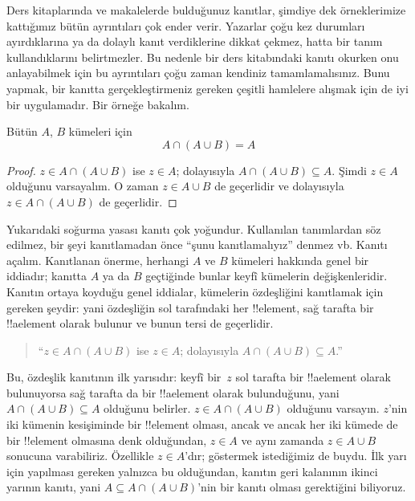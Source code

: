 \documentclass[../../../include/open-logic-section]{subfiles}
\begin{document}

Ders kitaplarında ve makalelerde bulduğunuz kanıtlar, şimdiye dek
örneklerimize kattığımız bütün ayrıntıları çok ender verir. Yazarlar
çoğu kez durumları ayırdıklarına ya da dolaylı kanıt verdiklerine dikkat
çekmez, hatta bir tanım kullandıklarını belirtmezler. Bu nedenle bir
ders kitabındaki kanıtı okurken onu anlayabilmek için bu ayrıntıları
çoğu zaman kendiniz tamamlamalısınız. Bunu yapmak, bir kanıtta
gerçekleştirmeniz gereken çeşitli hamlelere alışmak için de iyi bir
uygulamadır. Bir örneğe bakalım.

\begin{prop}[Soğurma]
Bütün $A$, $B$ kümeleri için
\[
A \cap (A \cup B) = A
\]
\end{prop}

\begin{proof}
$z \in A \cap (A \cup B)$ ise $z \in A$; dolayısıyla $A \cap (A \cup
B) \subseteq A$. Şimdi $z \in A$ olduğunu varsayalım. O zaman $z \in
A \cup B$ de geçerlidir ve dolayısıyla $z \in A \cap (A \cup B)$ de
geçerlidir.
\end{proof}

Yukarıdaki soğurma yasası kanıtı çok yoğundur. Kullanılan tanımlardan
söz edilmez, bir şeyi kanıtlamadan önce ``şunu kanıtlamalıyız'' denmez
vb. Kanıtı açalım. Kanıtlanan önerme, herhangi $A$ ve $B$ kümeleri
hakkında genel bir iddiadır; kanıtta $A$ ya da $B$ geçtiğinde bunlar
keyfî kümelerin değişkenleridir. Kanıtın ortaya koyduğu genel iddialar,
kümelerin özdeşliğini kanıtlamak için gereken şeydir: yani özdeşliğin
sol tarafındaki her !!{element}, sağ tarafta bir !!a{element} olarak bulunur ve
bunun tersi de geçerlidir.

\begin{quote}
``$z \in A \cap (A \cup B)$ ise $z \in A$; dolayısıyla $A \cap (A \cup
B) \subseteq A$.''
\end{quote}

Bu, özdeşlik kanıtının ilk yarısıdır: keyfî bir~$z$ sol tarafta bir
!!a{element} olarak bulunuyorsa sağ tarafta da bir !!a{element} olarak bulunduğunu, yani $A
  \cap (A \cup B) \subseteq A$ olduğunu belirler. $z \in A \cap (A \cup
  B)$ olduğunu varsayın. $z$'nin iki kümenin kesişiminde bir !!{element}
  olması, ancak ve ancak her iki kümede de bir !!{element} olmasına denk
  olduğundan, $z \in A$ ve aynı zamanda $z \in A \cup B$ sonucuna varabiliriz. Özellikle $z \in
A$'dır; göstermek istediğimiz de buydu. İlk yarı için yapılması gereken
yalnızca bu olduğundan, kanıtın geri kalanının ikinci yarının kanıtı,
yani $A \subseteq A \cap (A \cup B)$'nin bir kanıtı olması gerektiğini
biliyoruz.
\end{document}
